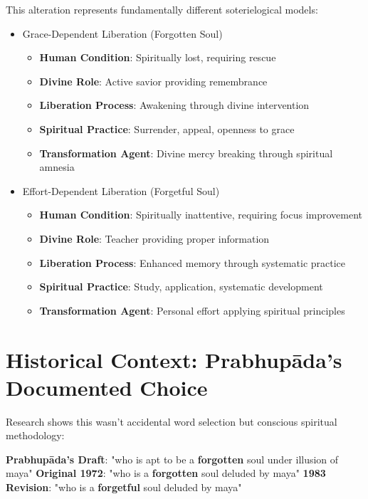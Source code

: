 \documentclass[11pt,twoside]{book}
\begin{document}
This alteration represents fundamentally different soterielogical models:
\begin{itemize}
\item Grace-Dependent Liberation (Forgotten Soul)
\label{sec:orgb98b9dc}
\begin{itemize}
\item \textbf{\textbf{Human Condition}}: Spiritually lost, requiring rescue
\item \textbf{\textbf{Divine Role}}: Active savior providing remembrance
\item \textbf{\textbf{Liberation Process}}: Awakening through divine intervention
\item \textbf{\textbf{Spiritual Practice}}: Surrender, appeal, openness to grace
\item \textbf{\textbf{Transformation Agent}}: Divine mercy breaking through spiritual amnesia
\end{itemize}
\item Effort-Dependent Liberation (Forgetful Soul)
\label{sec:org1eefe7d}
\begin{itemize}
\item \textbf{\textbf{Human Condition}}: Spiritually inattentive, requiring focus improvement
\item \textbf{\textbf{Divine Role}}: Teacher providing proper information
\item \textbf{\textbf{Liberation Process}}: Enhanced memory through systematic practice
\item \textbf{\textbf{Spiritual Practice}}: Study, application, systematic development
\item \textbf{\textbf{Transformation Agent}}: Personal effort applying spiritual principles
\end{itemize}
\end{itemize}
\section*{Historical Context: Prabhupāda's Documented Choice}
\label{sec:org22bc534}

Research shows this wasn't accidental word selection but conscious spiritual methodology:

\textbf{\textbf{Prabhupāda's Draft}}: "who is apt to be a \textbf{\textbf{\textbf{forgotten}}} soul under illusion of maya"
\textbf{\textbf{Original 1972}}: "who is a \textbf{\textbf{\textbf{forgotten}}} soul deluded by maya"
\textbf{\textbf{1983 Revision}}: "who is a \textbf{\textbf{\textbf{forgetful}}} soul deluded by maya"
\end{document}
